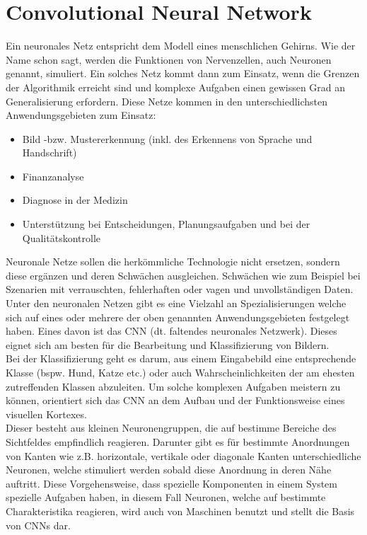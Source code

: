 \section{Convolutional Neural Network}
Ein neuronales Netz entspricht dem Modell eines menschlichen Gehirns. Wie der Name schon sagt, werden die Funktionen von Nervenzellen, auch Neuronen genannt, simuliert. Ein solches Netz kommt dann zum Einsatz, wenn die Grenzen der Algorithmik erreicht sind und komplexe Aufgaben einen gewissen Grad an Generalisierung erfordern. Diese Netze kommen in den unterschiedlichsten Anwendungsgebieten zum Einsatz: 
\begin{itemize}
  \item Bild -bzw. Mustererkennung (inkl. des Erkennens von Sprache und Handschrift)
  \item Finanzanalyse
  \item Diagnose in der Medizin
  \item Unterstützung bei Entscheidungen, Planungsaufgaben und bei der Qualitätskontrolle
\end{itemize}
Neuronale Netze sollen die herkömmliche Technologie nicht ersetzen, sondern diese ergänzen und deren Schwächen ausgleichen. Schwächen wie zum Beispiel bei Szenarien mit verrauschten, fehlerhaften oder vagen und unvollständigen Daten\cite{Kaffka.2017}.\\
Unter den neuronalen Netzen gibt es eine Vielzahl an Spezialisierungen welche sich auf eines oder mehrere der oben genannten Anwendungsgebieten festgelegt haben. Eines davon ist das CNN (dt. faltendes neuronales Netzwerk). Dieses eignet sich am besten für die Bearbeitung und Klassifizierung von Bildern.\\
Bei der Klassifizierung geht es darum, aus einem Eingabebild eine entsprechende Klasse (bspw. Hund, Katze etc.) oder auch Wahrscheinlichkeiten der am ehesten zutreffenden Klassen abzuleiten. Um solche komplexen Aufgaben meistern zu können, orientiert sich das CNN an dem Aufbau und der Funktionsweise eines visuellen Kortexes.\\
Dieser besteht aus kleinen Neuronengruppen, die auf bestimme Bereiche des Sichtfeldes empfindlich reagieren. Darunter gibt es für bestimmte Anordnungen von Kanten wie z.B. horizontale, vertikale oder diagonale Kanten unterschiedliche Neuronen, welche stimuliert werden sobald diese Anordnung in deren Nähe auftritt. Diese Vorgehensweise, dass spezielle Komponenten in einem System spezielle Aufgaben haben, in diesem Fall Neuronen, welche auf bestimmte Charakteristika reagieren, wird auch von Maschinen benutzt und stellt die Basis von CNNs dar.

